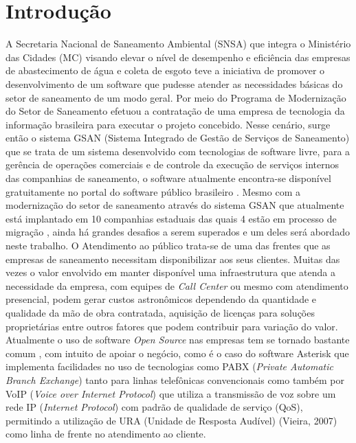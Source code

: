 \chapter[Introdução]{Introdução}

A Secretaria Nacional de Saneamento Ambiental (SNSA) que integra o Ministério das Cidades (MC) visando elevar o nível de desempenho e eficiência das empresas de abastecimento de água e coleta de esgoto teve a iniciativa de promover o desenvolvimento de um software que pudesse atender as necessidades básicas do setor de saneamento de um modo geral. Por meio do Programa de Modernização do Setor de Saneamento \cite{PMSS:2014} efetuou a contratação de uma empresa de tecnologia da informação brasileira para executar o projeto concebido.  Nesse cenário, surge então o sistema GSAN (Sistema Integrado de Gestão de Serviços de Saneamento) que se trata de um sistema desenvolvido com tecnologias de software livre, para a gerência de operações comerciais e de controle da execução de serviços internos das companhias de saneamento, o software atualmente encontra-se disponível gratuitamente no portal do software público brasileiro \cite{PORTAL:2014}. Mesmo com a modernização do setor de saneamento através do sistema GSAN que atualmente está implantado em 10 companhias estaduais das quais 4 estão em processo de migração \cite{PMSS:2014}, ainda há grandes desafios a serem superados e um deles será abordado neste trabalho.
O Atendimento ao público trata-se de uma das frentes que as empresas de saneamento necessitam disponibilizar aos seus clientes. Muitas das vezes o valor envolvido em manter disponível uma infraestrutura que atenda a necessidade da empresa, com equipes de \textit{Call Center} ou mesmo com atendimento presencial, podem gerar custos astronômicos dependendo da quantidade e qualidade da mão de obra contratada, aquisição de licenças para soluções proprietárias entre outros fatores que podem contribuir para variação do valor. Atualmente o uso de software \textit{Open Source} nas empresas tem se tornado bastante comum \cite{MEIRELLES2014}, com intuito de apoiar o negócio, como é o caso do software Asterisk que implementa facilidades no uso de tecnologias como PABX (\textit{Private Automatic Branch Exchange})  tanto para linhas telefônicas convencionais como também por VoIP (\textit{Voice over Internet Protocol}) que utiliza a transmissão de voz sobre um rede IP (\textit{Internet Protocol}) com padrão de qualidade de serviço (QoS), permitindo a utilização de URA (Unidade de Resposta Audível) (Vieira, 2007) como linha de frente no atendimento ao cliente.


